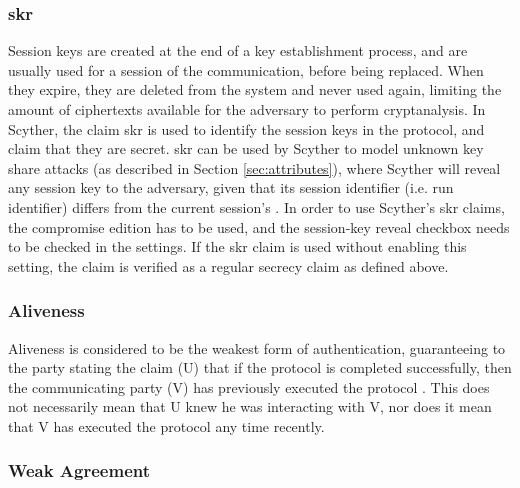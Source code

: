 \subsubsection{\gls{skr}}

Session keys are created at the end of a key establishment process, and are usually used for a session of the communication, before being replaced. When they expire, they are deleted from the system and never used again, limiting the amount of ciphertexts available for the adversary to perform cryptanalysis. In Scyther, the claim \gls{skr} is used to identify the session keys in the protocol, and claim that they are secret. \gls{skr} can be used by Scyther to model unknown key share attacks (as described in Section \ref{sec:attributes}), where Scyther will reveal any session key to the adversary, given that its session identifier (i.e. run identifier) differs from the current session's \cite{cremers2014improving}. In order to use Scyther's \gls{skr} claims, the compromise edition has to be used, and the session-key reveal checkbox needs to be checked in the settings. If the \gls{skr} claim is used without enabling this setting, the claim is verified as a regular secrecy claim as defined above.




\subsubsection{Aliveness}

Aliveness is considered to be the weakest form of authentication, guaranteeing to the party stating the claim (U) that if the protocol is completed successfully, then the communicating party (V) has previously executed the protocol \cite{lowe1997hierarchy}. This does not necessarily mean that U knew he was interacting with V, nor does it mean that V has executed the protocol any time recently.


\subsubsection{Weak Agreement}

